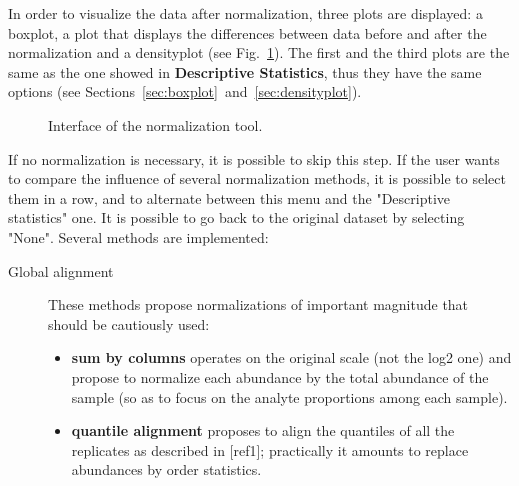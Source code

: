 \documentclass[12pt]{article}
\begin{document}
{In order to visualize the data after normalization, three plots are displayed:
a boxplot, a plot that displays the differences between data before and after 
the normalization and a densityplot (see Fig.~\ref{fig:norma}). The first and 
the third plots are the same as the one showed in \textbf{Descriptive 
Statistics}, thus they have the same options (see 
Sections~\ref{sec:boxplot}~and~\ref{sec:densityplot}).

\begin {figure}
\centering
{}
\caption{Interface of the normalization tool.}\label{fig:norma}
\end {figure}

If no normalization is necessary, it is possible to skip this step.
If the user wants to compare the influence of several normalization methods, 
it is possible to select them in a row, and to alternate between this menu 
and the "Descriptive statistics" one. It is possible to go back to the 
original dataset by selecting "None".
Several methods are implemented:
\begin {description}
\item[Global alignment]
These methods propose normalizations of important magnitude that should be 
cautiously used:
\begin{itemize}
\item \textbf{sum by columns} operates on the original scale (not the log2 one) 
and propose to normalize each abundance by the total abundance of the sample 
(so as to focus on the analyte proportions among each sample).
\item \textbf{quantile alignment} proposes to align the quantiles of all the 
replicates as described in [ref1]; practically it amounts to replace abundances 
by order statistics.\newline
\end{itemize}



\end{description}}
\end{document}
